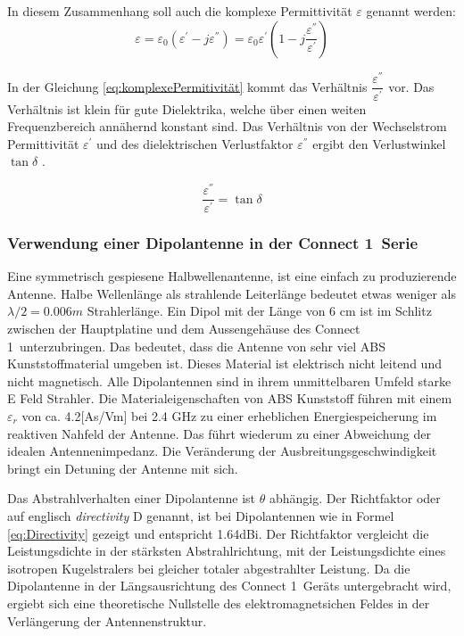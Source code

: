 In diesem Zusammenhang soll auch die komplexe Permittivität $\varepsilon$ genannt werden:
\begin{equation} \label{eq:komplexePermitivität}
\varepsilon=\varepsilon_0(\varepsilon^{'}-j\varepsilon^{''})=\varepsilon_0\varepsilon^{'}(1-j\dfrac{\varepsilon^{''}}{\varepsilon^{'}})
\end{equation}

In der Gleichung \ref{eq:komplexePermitivität} kommt das Verhältnis $\dfrac{\varepsilon^{''}}{\varepsilon^{'}}$ vor. Das Verhältnis ist klein für gute Dielektrika, welche über einen weiten Frequenzbereich annähernd konstant sind. Das Verhältnis von der Wechselstrom Permittivität $\varepsilon^{'}$ und des dielektrischen Verlustfaktor $\varepsilon^{''}$ ergibt den Verlustwinkel $\tan\delta$ \cite{elliott1981antenna}. 

\begin{equation} \label{eq:VerlustwinkelEpsilonPermitivität}
\dfrac{\varepsilon^{''}}{\varepsilon^{'}}=\tan\delta
\end{equation}


\subsubsection{Verwendung einer Dipolantenne in der  \glqq Connect 1\grqq \  Serie}
Eine symmetrisch gespiesene Halbwellenantenne,  ist eine einfach zu produzierende Antenne. Halbe Wellenlänge als strahlende Leiterlänge bedeutet etwas weniger als $\lambda/2=0.006m$ Strahlerlänge. Ein Dipol mit der Länge von 6 cm ist im Schlitz zwischen der Hauptplatine und dem Aussengehäuse des \glqq Connect 1\grqq \ unterzubringen. 
Das bedeutet, dass die Antenne von sehr viel ABS Kunststoffmaterial umgeben ist. Dieses Material ist elektrisch nicht leitend und nicht magnetisch. Alle Dipolantennen sind in ihrem unmittelbaren Umfeld starke E Feld Strahler.  Die Materialeigenschaften von ABS Kunststoff führen mit einem  $\varepsilon_r$ von ca. 4.2[As/Vm] bei 2.4 GHz zu einer erheblichen Energiespeicherung im reaktiven Nahfeld der Antenne. Das führt wiederum zu einer Abweichung der idealen Antennenimpedanz. Die Veränderung der Ausbreitungsgeschwindigkeit  bringt  ein Detuning der Antenne mit sich.


Das Abstrahlverhalten einer Dipolantenne ist $\theta$ abhängig. Der Richtfaktor oder auf englisch \textit{directivity} D genannt, ist bei Dipolantennen wie in Formel \ref{eq:Directivity} gezeigt und entspricht  1.64dBi.  Der Richtfaktor vergleicht die Leistungsdichte in der stärksten Abstrahlrichtung, mit der Leistungsdichte eines isotropen Kugelstralers bei gleicher totaler abgestrahlter Leistung. Da die Dipolantenne in der Längsausrichtung des \glqq Connect 1\grqq \ Geräts untergebracht wird, ergiebt sich eine theoretische Nullstelle des elektromagnetsichen Feldes in der Verlängerung der Antennenstruktur.

